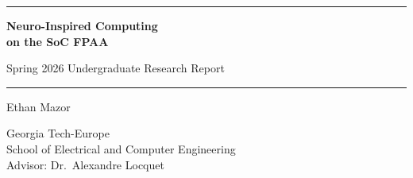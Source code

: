 \documentclass[12pt, letterpaper]{article}
\begin{document}
\begin{titlepage}
  \centering
  \vspace*{2cm}

  {\color{headingcolor}\rule{\linewidth}{2pt}}
  \vspace{1em}

  {\Huge\bfseries\color{headingcolor}
    Neuro-Inspired Computing\\[0.4em]
    on the SoC FPAA
  \par}
  \vspace{0.6em}
  {\Large\color{darkgray} Spring 2026 Undergraduate Research Report\par}
  \vspace{0.5em}
  {\color{rulecolor}\rule{\linewidth}{1.5pt}}

  \vspace{2.5cm}

  {\large Ethan Mazor\par}
  \vspace{0.4em}
  {\normalsize\color{darkgray}
    Georgia Tech-Europe\\
    School of Electrical and Computer Engineering\\[0.6em]
    Advisor: Dr.\ Alexandre Locquet\\[0.6em]
  \par}

  \vfill
\end{titlepage}

\thispagestyle{plain}

\begin{abstract}
This report documents progress made during the Spring 2026 semester of undergraduate research in the field of neuro-inspired analog computing. Work centered on implementing Hopfield networks on a Field Programmable Analog Array (FPAA) and using it to solve the Max-Cut problem. The primary experimental focus was investigating ways of escaping local energy minima via externally applied "kicks." The report covers a high-level overview of the FPAA platform, Hopfield networks and their implementation on the FPAA, the local vs.\ global minimum problem, experimental exploration of kick signal parameters, and lessons learned over the semester.
\end{abstract}

\end{document}
